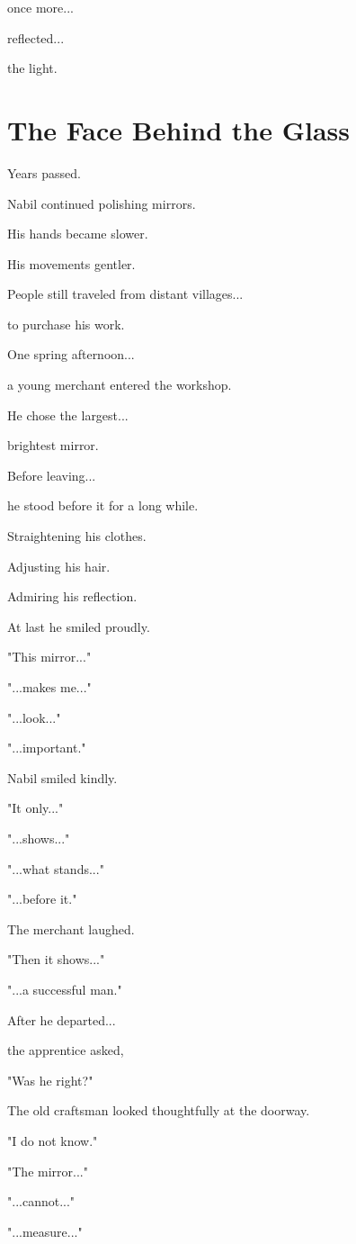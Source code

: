 \documentclass[12pt,openany]{book}
\begin{document}
once more...

reflected...

the light.
\section*{The Face Behind the Glass}

Years passed.

Nabil continued polishing mirrors.

His hands became slower.

His movements gentler.

People still traveled from distant villages...

to purchase his work.

One spring afternoon...

a young merchant entered the workshop.

He chose the largest...

brightest mirror.

Before leaving...

he stood before it for a long while.

Straightening his clothes.

Adjusting his hair.

Admiring his reflection.

At last he smiled proudly.

"This mirror..."

"...makes me..."

"...look..."

"...important."

Nabil smiled kindly.

"It only..."

"...shows..."

"...what stands..."

"...before it."

The merchant laughed.

"Then it shows..."

"...a successful man."

After he departed...

the apprentice asked,

"Was he right?"

The old craftsman looked thoughtfully at the doorway.

"I do not know."

"The mirror..."

"...cannot..."

"...measure..."
\end{document}
